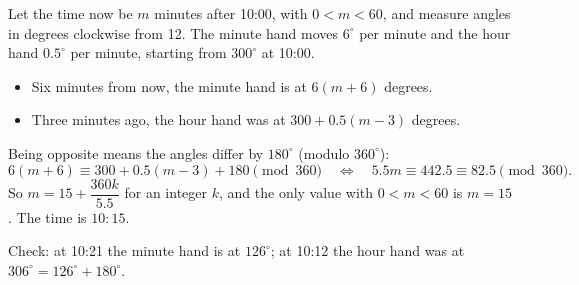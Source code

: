 Let the time now be $m$ minutes after 10:00, with $0<m<60$, and measure angles in degrees clockwise from 12. The minute hand moves $6^\circ$ per minute and the hour hand $0.5^\circ$ per minute, starting from $300^\circ$ at 10:00.
\begin{itemize}
\item Six minutes from now, the minute hand is at $6(m+6)$ degrees.
\item Three minutes ago, the hour hand was at $300+0.5(m-3)$ degrees.
\end{itemize}
Being opposite means the angles differ by $180^\circ$ (modulo $360^\circ$):
\[6(m+6)\equiv300+0.5(m-3)+180\pmod{360}\quad\Longleftrightarrow\quad5.5m\equiv442.5\equiv82.5\pmod{360}.\]
So $m=15+\dfrac{360k}{5.5}$ for an integer $k$, and the only value with $0<m<60$ is $m=15$. The time is $\boxed{10{:}15}$.

Check: at 10:21 the minute hand is at $126^\circ$; at 10:12 the hour hand was at $306^\circ=126^\circ+180^\circ$.

